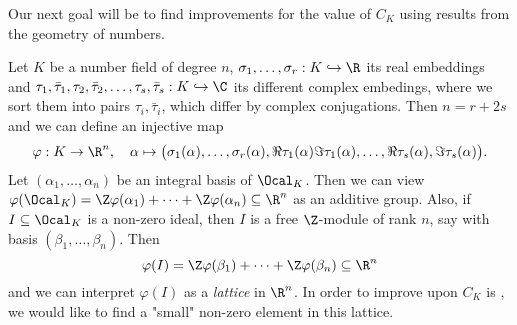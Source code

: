 Our next goal will be to find improvements for the value of \( C_K \) using results from the geometry of numbers.

\begin{idee*}
	Let \( K \) be a number field of degree \( n \), \( \sigma_1, \dotsc, \sigma_r: K \hookrightarrow \R \) its real embeddings and \( \tau_1, \bar{\tau}_1, \tau_2, \bar{\tau}_2, \dotsc, \tau_s, \bar{\tau}_s: K \hookrightarrow \C \) its different complex embedings, where we sort them into pairs \( \tau_i, \bar{\tau}_i \), which differ by complex conjugations.
	Then \( n = r + 2s \) and we can define an injective map 
	\[ \varphi: K \to \R^n,\quad \alpha \mapsto \big( \sigma_1(\alpha), \dotsc, \sigma_r(\alpha), \Re \tau_1(\alpha) \Im \tau_1(\alpha), \dotsc, \Re \tau_s(\alpha), \Im \tau_s(\alpha) \big). \]
	Let \( (\alpha_1, \dotsc, \alpha_n) \) be an integral basis of \( \Ocal_K \).
	Then we can view \( \varphi(\Ocal_K) = \Z \varphi(\alpha_1) + \dots + \Z \varphi(\alpha_n) \subseteq \R^n \) as an additive group.
	Also, if \( I \subseteq \Ocal_K \) is a non-zero ideal, then \( I \) is a free \( \Z \)-module of rank \( n \), say with basis \( (\beta_1, \dotsc, \beta_n) \).
	Then
	\[ \varphi(I) = \Z \varphi(\beta_1) + \dots + \Z \varphi(\beta_n) \subseteq \R^n \]
	and we can interpret \( \varphi(I) \) as a \emph{lattice} in \( \R^n \).
	In order to improve upon \( C_K \) is  , we would like to find a "small" non-zero element in this lattice.
\end{idee*}